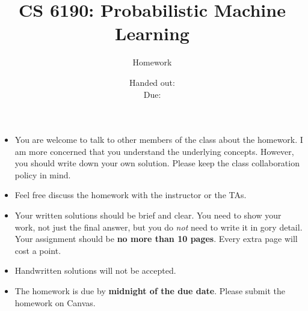 \documentclass[12pt, fullpage,letterpaper]{article}
\title{CS 6190: Probabilistic Machine Learning \semester}
\author{Homework \assignmentId}
\date{Handed out: \releaseDate\\
  Due: \dueDate}
\begin{document}
\maketitle


\footnotesize
	\begin{itemize}
		\item You are welcome to talk to other members of the class about
		the homework. I am more concerned that you understand the
		underlying concepts. However, you should write down your own
		solution. Please keep the class collaboration policy in mind.
		
		\item Feel free discuss the homework with the instructor or the TAs.
		
		\item Your written solutions should be brief and clear. You need to
		show your work, not just the final answer, but you do \emph{not}
		need to write it in gory detail. Your assignment should be {\bf no
			more than 10 pages}. Every extra page will cost a point.
		
		\item Handwritten solutions will not be accepted.
		
		\item The homework is due by \textbf{midnight of the due date}. Please submit
		the homework on Canvas.
	\end{itemize}

\end{document}
